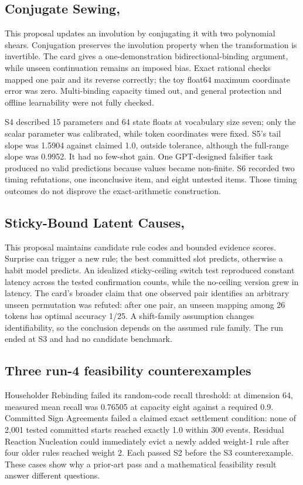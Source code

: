 \subsection{Conjugate Sewing, }

This proposal updates an involution by conjugating it with two polynomial shears. Conjugation preserves the involution property when the transformation is invertible. The card gives a one-demonstration bidirectional-binding argument, while unseen continuation remains an imposed bias. Exact rational checks mapped one pair and its reverse correctly; the toy float64 maximum coordinate error was zero. Multi-binding capacity timed out, and general protection and offline learnability were not fully checked.

S4 described 15 parameters and 64 state floats at vocabulary size seven; only the scalar parameter was calibrated, while token coordinates were fixed. S5's tail slope was 1.5904 against claimed 1.0, outside tolerance, although the full-range slope was 0.9952. It had no few-shot gain. One GPT-designed falsifier task produced no valid predictions because values became non-finite. S6 recorded two timing refutations, one inconclusive item, and eight untested items. Those timing outcomes do not disprove the exact-arithmetic construction.

\subsection{Sticky-Bound Latent Causes, }

This proposal maintains candidate rule codes and bounded evidence scores. Surprise can trigger a new rule; the best committed slot predicts, otherwise a habit model predicts. An idealized sticky-ceiling switch test reproduced constant latency across the tested confirmation counts, while the no-ceiling version grew in latency. The card's broader claim that one observed pair identifies an arbitrary unseen permutation was refuted: after one pair, an unseen mapping among 26 tokens has optimal accuracy 1/25. A shift-family assumption changes identifiability, so the conclusion depends on the assumed rule family. The run ended at S3 and had no candidate benchmark.

\subsection{Three run-4 feasibility counterexamples}

Householder Rebinding failed its random-code recall threshold: at dimension 64, measured mean recall was 0.76505 at capacity eight against a required 0.9. Committed Sign Agreements failed a claimed exact settlement condition: none of 2,001 tested committed starts reached exactly 1.0 within 300 events. Residual Reaction Nucleation could immediately evict a newly added weight-1 rule after four older rules reached weight 2. Each passed S2 before the S3 counterexample. These cases show why a prior-art pass and a mathematical feasibility result answer different questions.


